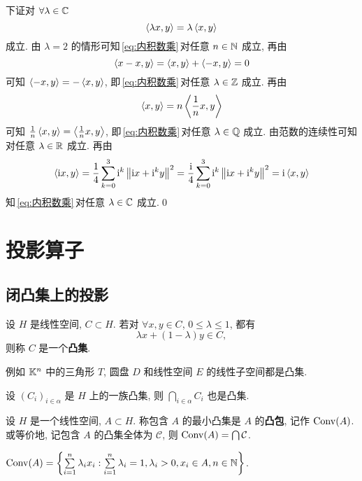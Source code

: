 \begin{Proof}
		下证对 $ \forall\lambda\in\mathbb{C} $
		\begin{equation}\label{eq:内积数乘}
			\left\langle \lambda x, y \right\rangle=\lambda\left\langle x, y \right\rangle
		\end{equation}
		成立. 由 $ \lambda=2 $ 的情形可知\,\eqref{eq:内积数乘}\,对任意 $ n\in\mathbb{N} $ 成立, 再由
		\[
			\left\langle x-x, y \right\rangle=\left\langle x, y \right\rangle+\left\langle -x, y \right\rangle=0
		\]
		可知 $ \left\langle -x, y \right\rangle=-\left\langle x, y \right\rangle $, 即\,\eqref{eq:内积数乘}\,对任意 $ \lambda\in\mathbb{Z} $ 成立. 再由
		\[
			\left\langle x, y \right\rangle=n\left\langle \frac{1}{n}x, y \right\rangle
		\]
		可知 $ \frac{1}{n}\left\langle x, y \right\rangle=\left\langle \frac{1}{n}x, y \right\rangle $, 即\,\eqref{eq:内积数乘}\,对任意 $ \lambda\in\mathbb{Q} $ 成立. 由范数的连续性可知对任意 $ \lambda\in\mathbb{R} $ 成立. 再由
		\[
			\left\langle \mathrm{i} x, y \right\rangle=\frac{1}{4}\sum_{k=0}^{3}\mathrm{i}^{k}\left\| \mathrm{i} x+\mathrm{i}^{k}y \right\|^{2}=\frac{\mathrm{i}}{4}\sum_{k=0}^{3}\mathrm{i}^{k}\left\| \mathrm{i} x+\mathrm{i}^{k}y \right\|^{2}=\mathrm{i}\left\langle x, y \right\rangle
		\]
		知\,\eqref{eq:内积数乘}\,对任意 $ \lambda\in\mathbb{C} $ 成立.\qed
	\end{Proof}

\section{投影算子}
	\subsection{闭凸集上的投影}
	
	\begin{Definition}[凸集]\label{def:凸集}
		设 $ H $ 是线性空间, $ C\subset H $. 若对 $ \forall x, y\in C $, $ 0\leqslant\lambda\leqslant1 $, 都有
		\[
			\lambda x+(1-\lambda)y\in C,
		\]
		则称 $ C $ 是一个\textbf{凸集}.
	\end{Definition}
	例如 $ \mathbb{K}^{n} $ 中的三角形 $ T $, 圆盘 $ D $ 和线性空间 $ E $ 的线性子空间都是凸集.
	
	\begin{Proposition}
		设 $ (C_{i})_{i\in\alpha} $ 是 $ H $ 上的一族凸集, 则 $ \bigcap_{i\in\alpha}C_{i} $ 也是凸集.
	\end{Proposition}

	\begin{Definition}[凸包]\label{def:凸包}
		 设 $ H $ 是一个线性空间, $ A\subset H $. 称包含 $ A $ 的最小凸集是 $ A $ 的\textbf{凸包}, 记作 $ \operatorname{Conv}(A) $. 或等价地, 记包含 $ A $ 的凸集全体为 $ \mathcal{C} $, 则 $ \operatorname{Conv}(A)=\bigcap \mathcal{C} $. 
	\end{Definition}

	\begin{Proposition}
		$ \operatorname{Conv}(A)=\left\{ \sum\limits_{i=1}^{n}\lambda_{i}x_{i}:\sum\limits_{i=1}^{n}\lambda_{i}=1, \lambda_{i}>0, x_{i}\in A, n\in \mathbb{N} \right\} $. 
	\end{Proposition}
	
